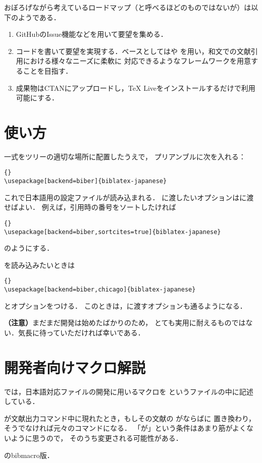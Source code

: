 \documentclass[lualatex,ja=standard,magstyle=real]{bxjsarticle}
\begin{document}
おぼろげながら考えているロードマップ（と呼べるほどのものではないが）は以下のようである．
\begin{enumerate}
\item GitHubのIssue機能などを用いて要望を集める．
\item コードを書いて要望を実現する．ベースとしてはや
  を用い，和文での文献引用における様々なニーズに柔軟に
  対応できるようなフレームワークを用意することを目指す．
\item 成果物はCTANにアップロードし，\TeX{} Liveをインストールするだけで利用可能にする．
\end{enumerate}

\section{使い方}
一式をツリーの適切な場所に配置したうえで，
プリアンブルに次を入れる：
\begin{lstlisting}[style=latex]{}
\usepackage[backend=biber]{biblatex-japanese}
\end{lstlisting}
これで日本語用の設定ファイルが読み込まれる．
に渡したいオプションはに渡せばよい．
例えば，引用時の番号をソートしたければ
\begin{lstlisting}[style=latex]{}
\usepackage[backend=biber,sortcites=true]{biblatex-japanese}
\end{lstlisting}
のようにする．

を読み込みたいときは
\begin{lstlisting}[style=latex]{}
\usepackage[backend=biber,chicago]{biblatex-japanese}
\end{lstlisting}
とオプションをつける．
このときは，に渡すオプションも通るようになる．

\noindent\textbf{（注意）}まだまだ開発は始めたばかりのため，
とても実用に耐えるものではない．気長に待っていただければ幸いである．

\section{開発者向けマクロ解説}
では，日本語対応ファイルの開発に用いるマクロを
というファイルの中に記述している．

\begin{ltxsyntax}

  が文献出力コマンド中に現れたとき，もしその文献の
  がならばに
  置き換わり，そうでなければ元々のコマンドになる．
  「が」という条件はあまり筋がよくないように思うので，
  そのうち変更される可能性がある．


  のbibmacro版．
\end{ltxsyntax}
\end{document}
